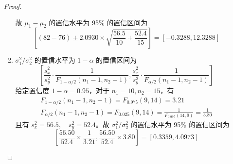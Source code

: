 \documentclass[normal,cn]{elegantnote}
\begin{document}
\begin{enumerate}
\begin{proof}
\begin{enumerate}
\begin{equation*}
                      \end{equation*}
                      故 $\mu_{1}-\mu_{2}$ 的置信水平为 95\% 的置信区间为
                      \begin{equation*}
                          \left[\left(82-76\right) \pm 2.0930 \times \sqrt{\frac{56.5}{10}+\frac{52.4}{15}}\right]=[-0.3288,12.3288]
                      \end{equation*}
                \item $\sigma_{1}^{2}/\sigma_{2}^{2}$ 的置信水平为 $1-\alpha$ 的置信区间为
                      \begin{equation*}
                          \left[\frac{s_{x}^{2}}{s_{y}^{2}}\cdot\frac{1}{F_{1-\alpha/2}\left(n_{1}-1,n_{2}-1\right)},\frac{s_{x}^{2}}{s_{y}^{2}}\cdot\frac{1}{F_{\alpha/2}\left(n_{1}-1,n_{2}-1\right)}\right]
                      \end{equation*}
                      给定置信度 $1-\alpha=0.95$，对于 $n_{1}=10,n_{2}=15$，有
                      \begin{gather*}
                          F_{1-\alpha/2}\left(n_{1}-1,n_{2}-1\right)=F_{0.975}(9,14)=3.21 \\
                          F_{\alpha/2}\left(n_{1}-1,n_{2}-1\right)=F_{0.025}(9,14)=\frac{1}{F_{0.975}(14,9)}=\frac{1}{3.80}
                      \end{gather*}
                      且有 $s_{x}^{2}=56.5,\quad s_{y}^{2}=52.4$。故 $\sigma_{1}^{2}/\sigma_{2}^{2}$ 的置信水平为 95\% 的置信区间为
                      \begin{equation*}
                          \left[\frac{56.50}{52.4}\times\frac{1}{3.21},\frac{56.50}{52.4}\times 3.80\right]=[0.3359,4.0973]
                      \end{equation*}
            \end{enumerate}
        \end{proof}
\end{enumerate}
\end{document}

